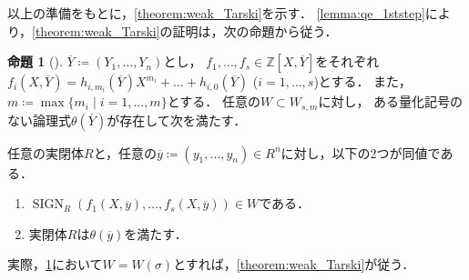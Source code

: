 \documentclass[uplatex, dvipdfmx]{jsarticle}
\numberwithin{equation}{section}
\newcommand{\Z}{\mathbb{Z}}
\DeclareMathOperator{\SIGN}{SIGN}
\theoremstyle{definition}
\newtheorem{proposition}[definition]{命題}
\begin{document}
以上の準備をもとに，\cref{theorem:weak_Tarski}を示す．
\cref{lemma:qe_1ststep}により，\cref{theorem:weak_Tarski}の証明は，次の命題から従う．

\begin{proposition}[{\cite[Proposition 1.4.6.]{MR1659509}}] \label{proposition:weak_Tarski}
     $\overline{Y}\coloneqq (Y_1, \dots, Y_n)$とし，
     $f_1, \dots, f_s \in \Z\left[X, \overline{Y}\right]$をそれぞれ
     $f_i \left(X, \overline{Y} \right) = h_{i, m_i}\left( \overline{Y} \right) X^{m_i} + \dots + h_{i, 0}\left(\overline{Y}\right)$ ($i=1, \dots, s$)とする．
     また，$m\coloneqq \max\{m_i \mid i=1, \dots, m\}$とする．
     任意の$W \subset W_{s,m}$に対し，
     ある量化記号のない論理式$\theta\left(\overline{Y}\right)$が存在して次を満たす．

     任意の実閉体$R$と，任意の$\overline{y} \coloneqq (y_1, \dots, y_n) \in R^n$に対し，以下の2つが同値である．
     \begin{enumerate}
          \item $\SIGN_R(f_1(X, \overline{y}), \dots, f_s(X, \overline{y})) \in W$である．
          \item 実閉体$R$は$\theta(\overline{y})$を満たす．
     \end{enumerate}
\end{proposition}

実際，\cref{proposition:weak_Tarski}において$W=W(\sigma)$とすれば，\cref{theorem:weak_Tarski}が従う．
\end{document}

